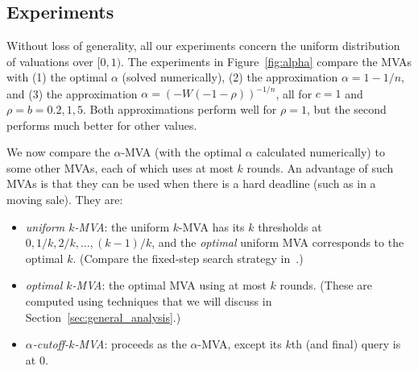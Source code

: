 \subsection{Experiments}\label{sec:eff_experiment}

Without loss of generality, all our experiments concern the uniform distribution of valuations over $[0,1)$.
The experiments in Figure~\ref{fig:alpha} compare the MVAs with (1) the
optimal $\alpha$ (solved numerically), (2) the approximation
 $\alpha = 1-1/n$, and (3) the approximation 
$\alpha = (-W(-1-\rho))^{-1/n}$, all for $c=1$ and
$\rho = b = 0.2, 1, 5$.
Both approximations perform well for $\rho=1$, but the second performs much
better for other values.





We now compare the $\alpha$-MVA (with the optimal $\alpha$ calculated
numerically) to some other MVAs, each of which uses at most $k$ rounds.
An advantage of such MVAs is that they can be used when there is a hard
deadline (such as in a moving sale).
They are:

\begin{itemize}
\item {\em uniform $k$-MVA}:  the uniform $k$-MVA has its $k$
  thresholds at $0, 1/k, 2/k, \ldots, (k-1)/k$, and the {\em optimal} uniform MVA
  corresponds to the optimal $k$.  (Compare the fixed-step search strategy in~\cite{SarneSR2010:IncreasingSearch,DBLP:conf/iwdc/HassanJ04}.)
\item {\em optimal $k$-MVA}: the optimal MVA using at most $k$ rounds.
  (These are computed using techniques that we will discuss in Section~\ref{sec:general_analysis}.)
\item {\em $\alpha$-cutoff-$k$-MVA}: proceeds as the $\alpha$-MVA, except
  its $k$th (and final) query is at $0$.
\end{itemize}



